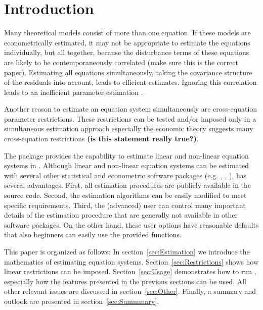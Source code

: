 


\section{Introduction}

Many theoretical models consist of more than one equation. If these
models are econometrically estimated, it may not be appropriate to
estimate the equations individually, but all together, because the
disturbance terms of these equations are likely to be contemporaneously
correlated \citep{theil71} (make sure this is the correct paper).
Estimating all equations simultaneously, taking the
covariance structure of the residuals into account, leads to efficient
estimates.
Ignoring this correlation leads to an inefficient
parameter estimation \citep{zellner62}.

Another reason to estimate an equation system simultaneously are
cross-equation parameter restrictions. These restrictions can be
tested and/or imposed only in a simultaneous estimation
approach especially the economic theory suggests many cross-equation
restrictions \textbf{(is this statement really true?)}.

The  package provides the capability to estimate
linear and non-linear equation systems in .
Although linear and non-linear equation systems can be estimated
with several other statistical and econometric software packages
(e.g. , , ),
 has several advantages.
First, all estimation procedures are publicly available in the source code.
Second, the estimation algorithms can be easily modified to meet specific
requirements.
Third, the (advanced) user can control many important details of the
estimation procedure that are generally not available in other software
packages.
On the other hand, these user options have reasonable defaults that also
beginners can easily use the provided functions.

This paper is organized as follows: In section~\ref{sec:Estimation} we
introduce the mathematics of estimating equation systems.
Section~\ref{sec:Restrictions} shows how linear restrictions can be
imposed.
Section~\ref{sec:Usage} demonstrates how to run
, especially how the features presented in the previous
sections can be used.
All other relevant issues are discussed in section~\ref{sec:Other}.
Finally, a summary and outlook are presented in
section~\ref{sec:Summmary}.


